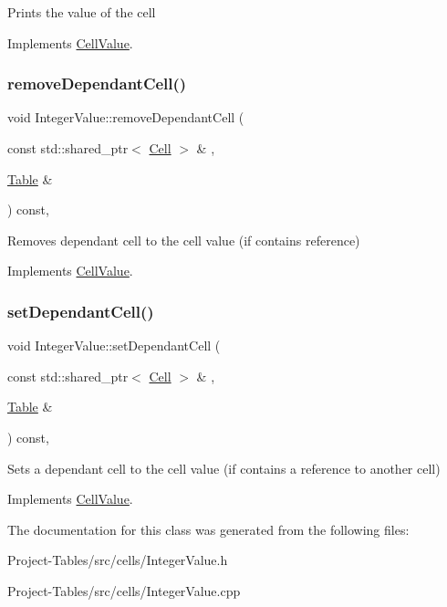 Prints the value of the cell 

Implements \hyperlink{classCellValue_a12d1cf68a5ba83f0c375441729772742}{Cell\+Value}.

\mbox{\label{classIntegerValue_a093c194fb370dac25a867980bc4a4eca}} 
\subsubsection{\texorpdfstring{remove\+Dependant\+Cell()}{removeDependantCell()}}
{\footnotesize\ttfamily void Integer\+Value\+::remove\+Dependant\+Cell (\begin{DoxyParamCaption}\item[{const std\+::shared\+\_\+ptr$<$ \hyperlink{classCell}{Cell} $>$ \&}]{,  }\item[{\hyperlink{classTable}{Table} \&}]{ }\end{DoxyParamCaption}) const\hspace{0.3cm}{\ttfamily [override]}, {\ttfamily [virtual]}}

Removes dependant cell to the cell value (if contains reference) 

Implements \hyperlink{classCellValue_a72b4390db6c53e525550cefade66fb0e}{Cell\+Value}.

\mbox{\label{classIntegerValue_a3bd7ab4408d25b74225931d89f62ac8b}} 
\subsubsection{\texorpdfstring{set\+Dependant\+Cell()}{setDependantCell()}}
{\footnotesize\ttfamily void Integer\+Value\+::set\+Dependant\+Cell (\begin{DoxyParamCaption}\item[{const std\+::shared\+\_\+ptr$<$ \hyperlink{classCell}{Cell} $>$ \&}]{,  }\item[{\hyperlink{classTable}{Table} \&}]{ }\end{DoxyParamCaption}) const\hspace{0.3cm}{\ttfamily [override]}, {\ttfamily [virtual]}}

Sets a dependant cell to the cell value (if contains a reference to another cell) 

Implements \hyperlink{classCellValue_ad2437fb3d4d4a96d9a76c857b3d04231}{Cell\+Value}.



The documentation for this class was generated from the following files\+:\begin{DoxyCompactItemize}
\item 
Project-\/\+Tables/src/cells/Integer\+Value.\+h\item 
Project-\/\+Tables/src/cells/Integer\+Value.\+cpp\end{DoxyCompactItemize}
